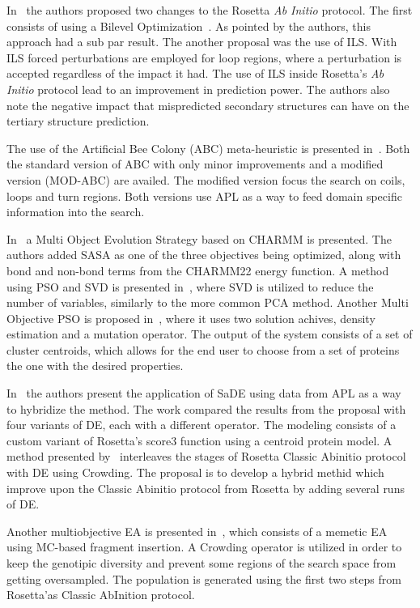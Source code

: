 In~\cite{kandathil2018improved} the authors proposed two changes to the Rosetta
\textit{Ab Initio} protocol. The first consists of using a Bilevel
Optimization~\cite{sinha2018review}. As pointed by the authors, this approach had
a sub par result. The another proposal was the use of \ac{ILS}. With ILS forced
perturbations are employed for loop regions, where a perturbation is accepted
regardless of the impact it had. The use of \ac{ILS} inside Rosetta's
\textit{Ab Initio} protocol lead to an improvement in prediction power.
The authors also note the negative impact that mispredicted secondary structures
can have on the tertiary structure prediction.

The use of the Artificial Bee Colony (ABC) meta-heuristic is presented
in~\cite{correa2018knowledge}. Both the standard version of ABC with only
minor improvements and a modified version (MOD-ABC) are availed.
The modified version focus the search on coils, loops and turn regions. Both versions
use \ac{APL} as a way to feed domain specific information into the search.

In~\cite{gao2018incorporation} a Multi Object Evolution Strategy based on
CHARMM is presented. The authors added \ac{SASA} as one of the three objectives
being optimized, along with bond and non-bond terms from the CHARMM22 energy
function. A method using \ac{PSO} and \ac{SVD} is presented in~\cite{alvarez2018protein},
where \ac{SVD} is utilized to reduce the number of variables, similarly to the
more common \ac{PCA} method. Another Multi Objective \ac{PSO} is proposed
in~\cite{song2018adoption}, where it uses two solution achives, density estimation
and a mutation operator. The output of the system consists of a set of cluster
centroids, which allows for the end user to choose from a set of proteins the
one with the desired properties.

In~\cite{narloch2019knowledge} the authors present the application of \ac{SaDE}
using data from \ac{APL} as a way to hybridize the method. The work compared the
results from the proposal with four variants of \ac{DE}, each with a different
operator. The modeling consists of a custom variant of Rosetta's score3 function
using a centroid protein model. A method presented by~\cite{varela2019crowding}
interleaves the stages of Rosetta Classic Abinitio protocol with \ac{DE} using
Crowding. The proposal is to develop a hybrid methid which improve upon the
Classic Abinitio protocol from Rosetta by adding several runs of \ac{DE}.

Another multiobjective \ac{EA} is presented in~\cite{zaman2019balancing}, which
consists of a memetic EA using \ac{MC}-based fragment insertion. A Crowding operator
is utilized in order to keep the genotipic diversity and prevent some regions
of the search space from getting oversampled. The population is generated using
the first two steps from Rosetta'as Classic AbInition protocol.

